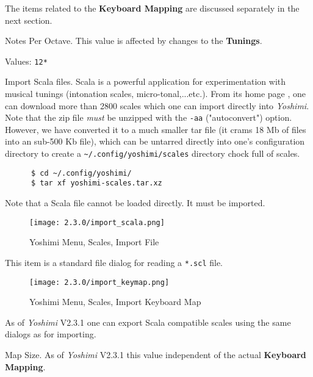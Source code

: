    The items related to the \textbf{Keyboard Mapping} are discussed
   separately in the next section.

   Notes Per Octave.
   This value is affected by changes to the \textbf{Tunings}.

   Values: \texttt{12*}

   Import Scala files.
   Scala is a powerful application for experimentation with musical tunings
   (intonation scales, micro-tonal,...etc.). From its home page \cite{scala},
   one can download more than 2800 scales which one can import directly into
   \textsl{Yoshimi}.  Note that the zip file \textsl{must} be unzipped with
   the \texttt{-aa} ("autoconvert") option.  However, we have converted it to a
   much smaller tar file (it crams 18 Mb of files into an sub-500 Kb file),
   which can be untarred directly into
   one's configuration directory to create a
   \texttt{\textasciitilde/.config/yoshimi/scales} directory chock full of
   scales.

    \begin{verbatim}
      $ cd ~/.config/yoshimi/
      $ tar xf yoshimi-scales.tar.xz
    \end{verbatim}

    Note that a Scala file cannot be loaded directly.  It must be imported.

\begin{figure}[H]
   \centering
   \texttt{[image: 2.3.0/import\_scala.png]}
   \caption{Yoshimi Menu, Scales, Import File}
   \label{fig:yoshimi_scales_import_file}
\end{figure}

   This item is a standard file dialog for reading
   a \texttt{*.scl} file.

\begin{figure}[H]
   \centering
   \texttt{[image: 2.3.0/import\_keymap.png]}
   \caption{Yoshimi Menu, Scales, Import Keyboard Map}
   \label{fig:yoshimi_scales_import_keyboard_map}
\end{figure}

   As of \textsl{Yoshimi} V2.3.1 one can export Scala compatible scales using
   the same dialogs as for importing.

   Map Size.
   As of \textsl{Yoshimi} V2.3.1 this value independent of the actual
   \textbf{Keyboard Mapping}.

